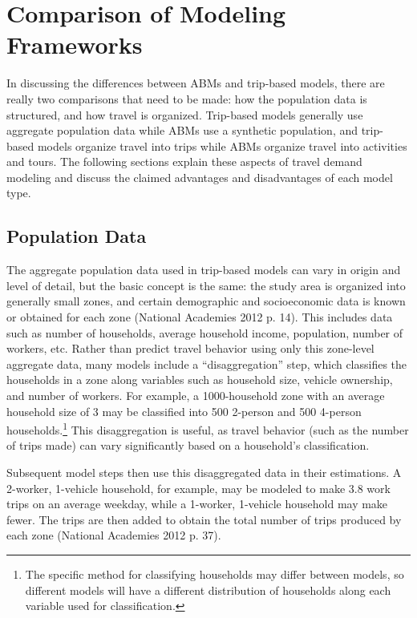 \documentclass[fancy, oneside, mastersfancy, ms]{byuthesis}
\begin{document}
\section{Comparison of Modeling
Frameworks}\label{comparison-of-modeling-frameworks}

In discussing the differences between ABMs and trip-based models, there
are really two comparisons that need to be made: how the population data
is structured, and how travel is organized. Trip-based models generally
use aggregate population data while ABMs use a synthetic population, and
trip-based models organize travel into trips while ABMs organize travel
into activities and tours. The following sections explain these aspects
of travel demand modeling and discuss the claimed advantages and
disadvantages of each model type.

\subsection{Population Data}\label{population-data}

The aggregate population data used in trip-based models can vary in
origin and level of detail, but the basic concept is the same: the study
area is organized into generally small zones, and certain demographic
and socioeconomic data is known or obtained for each zone (National
Academies 2012 p. 14). This includes data such as number of households,
average household income, population, number of workers, etc. Rather
than predict travel behavior using only this zone-level aggregate data,
many models include a ``disaggregation'' step, which classifies the
households in a zone along variables such as household size, vehicle
ownership, and number of workers. For example, a 1000-household zone
with an average household size of 3 may be classified into 500 2-person
and 500 4-person households.\footnote{The specific method for
  classifying households may differ between models, so different models
  will have a different distribution of households along each variable
  used for classification.} This disaggregation is useful, as travel
behavior (such as the number of trips made) can vary significantly based
on a household's classification.

Subsequent model steps then use this disaggregated data in their
estimations. A 2-worker, 1-vehicle household, for example, may be
modeled to make 3.8 work trips on an average weekday, while a 1-worker,
1-vehicle household may make fewer. The trips are then added to obtain
the total number of trips produced by each zone (National Academies 2012
p. 37).
\end{document}
